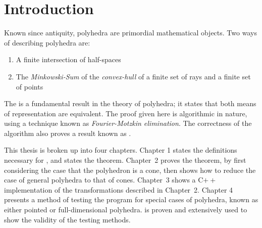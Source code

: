 \chapter*{Introduction}

Known since antiquity, polyhedra are primordial mathematical objects.  Two ways of describing polyhedra are:
\begin{enumerate}
  \item A finite intersection of half-spaces
  \item The \textit{Minkowski-Sum} of the \textit{convex-hull} of a finite set of rays and a finite set of points
\end{enumerate}
The {\MWT} is a fundamental result in the theory of polyhedra; it states that both means of representation are equivalent.  The proof given here is algorithmic in nature, using a technique known as \textit{Fourier-Motzkin elimination}.  The correctness of the algorithm also proves a result known as .

This thesis is broken up into four chapters.  Chapter 1 states the definitions necessary for {\MWT}, and states the theorem.  Chapter~2 proves the theorem, by first considering the case that the polyhedron is a cone, then shows how to reduce the case of general polyhedra to that of cones.  Chapter~3 shows a C$++$ implementation of the transformations described in Chapter~2.  Chapter 4 presents a method of testing the program for special cases of polyhedra, known as either pointed or full-dimensional polyhedra.   is proven and extensively used to show the validity of the testing methods.
